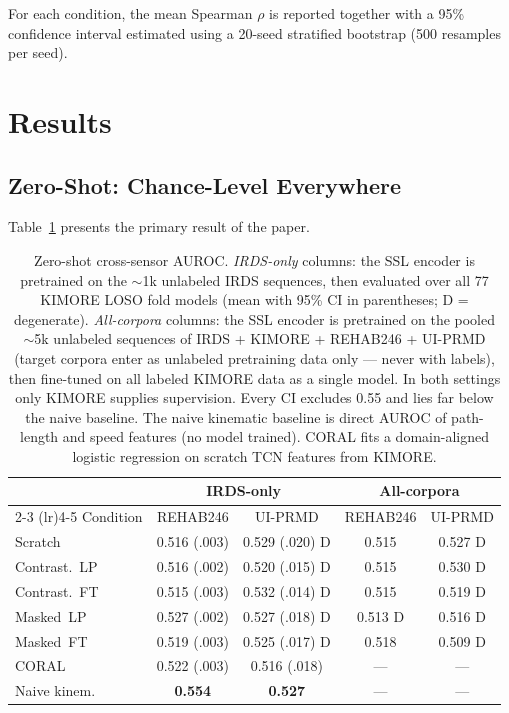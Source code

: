 \documentclass[10pt,journal]{IEEEtran}
\begin{document}
For each condition, the mean Spearman $\rho$ is reported together with a 95\% confidence interval estimated using a 20-seed stratified bootstrap (500 resamples per seed).

\section{Results}
\label{sec:results}

\subsection{Zero-Shot: Chance-Level Everywhere}
\label{sec:zeroshot-results}

Table~\ref{tab:zeroshot} presents the primary result of the paper.

\begin{table}[t]
\centering
\caption{Zero-shot cross-sensor AUROC. \emph{IRDS-only} columns: the SSL encoder is pretrained on the $\sim$1k unlabeled IRDS sequences, then evaluated over all 77 KIMORE LOSO fold models (mean with 95\% CI in parentheses; D = degenerate). \emph{All-corpora} columns: the SSL encoder is pretrained on the pooled $\sim$5k unlabeled sequences of IRDS + KIMORE + REHAB246 + UI-PRMD (target corpora enter as unlabeled pretraining data only --- never with labels), then fine-tuned on all labeled KIMORE data as a single model. In both settings only KIMORE supplies supervision. Every CI excludes 0.55 and lies far below the naive baseline. The naive kinematic baseline is direct AUROC of path-length and speed features (no model trained). CORAL fits a domain-aligned logistic regression on scratch TCN features from KIMORE.}
\label{tab:zeroshot}
\small
\setlength{\tabcolsep}{2.5pt}
\begin{tabular}{@{}lcccc@{}}
\toprule
& \multicolumn{2}{c}{IRDS-only} & \multicolumn{2}{c}{All-corpora} \\
\cmidrule(lr){2-3} \cmidrule(lr){4-5}
Condition & REHAB246 & UI-PRMD & REHAB246 & UI-PRMD \\
\midrule
Scratch         & 0.516 (.003)  & 0.529 (.020) D & 0.515 & 0.527 D \\
Contrast.~LP    & 0.516 (.002)  & 0.520 (.015) D & 0.515 & 0.530 D \\
Contrast.~FT    & 0.515 (.003)  & 0.532 (.014) D & 0.515 & 0.519 D \\
Masked~LP       & 0.527 (.002)  & 0.527 (.018) D & 0.513 D & 0.516 D \\
Masked~FT       & 0.519 (.003)  & 0.525 (.017) D & 0.518 & 0.509 D \\
\midrule
CORAL           & 0.522 (.003)  & 0.516 (.018)   & ---   & --- \\
\midrule
Naive kinem.    & \textbf{0.554} & \textbf{0.527} & ---   & --- \\
\bottomrule
\end{tabular}
\end{table}
\end{document}
